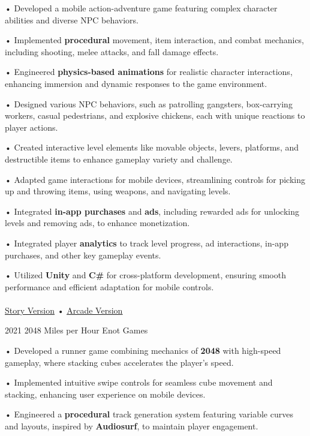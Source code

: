 \documentclass[9pt]{developercv} %
\begin{document}
\begin{entrylist}
{    • Developed a mobile action-adventure game featuring complex character abilities and diverse NPC behaviors.

    • Implemented \textbf{procedural} movement, item interaction, and combat mechanics, including shooting, melee attacks, and fall damage effects.

    • Engineered \textbf{physics-based animations} for realistic character interactions, enhancing immersion and dynamic responses to the game environment.

    • Designed various NPC behaviors, such as patrolling gangsters, box-carrying workers, casual pedestrians, and explosive chickens, each with unique reactions to player actions.

    • Created interactive level elements like movable objects, levers, platforms, and destructible items to enhance gameplay variety and challenge.

    • Adapted game interactions for mobile devices, streamlining controls for picking up and throwing items, using weapons, and navigating levels.

    • Integrated \textbf{in-app purchases} and \textbf{ads}, including rewarded ads for unlocking levels and removing ads, to enhance monetization.

    • Integrated player \textbf{analytics} to track level progress, ad interactions, in-app purchases, and other key gameplay events.

    • Utilized \textbf{Unity} and \textbf{C\#} for cross-platform development, ensuring smooth performance and efficient adaptation for mobile controls.
    \\
    \\
    {\href{https://apkpure.com/ru/kirbilly-human-ragdoll-fall/com.EnotGame.Kirbilly}{\uline{Story Version}}} •
    {\href{https://apkpure.com/ru/stick-monster-ragdoll-gang-3d/com.EnotGame.StickMonsterRagdollGang}{\uline{Arcade Version}}}
    \\
    }
    \entry
    {2021}
    {2048 Miles per Hour}
    {Enot Games}
    {

        • Developed a runner game combining mechanics of \textbf{2048} with high-speed gameplay, where stacking cubes accelerates the player's speed.

        • Implemented intuitive swipe controls for seamless cube movement and stacking, enhancing user experience on mobile devices.

        • Engineered a \textbf{procedural} track generation system featuring variable curves and layouts, inspired by \textbf{Audiosurf}, to maintain player engagement.

}
\end{entrylist}
\end{document}
